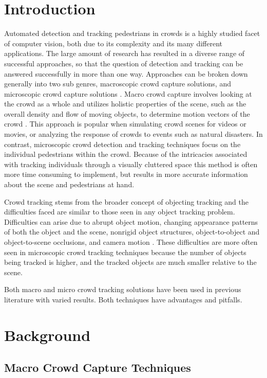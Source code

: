 \documentclass[12pt, onecolumn, conference]{IEEEtran}
\begin{document}
\section{Introduction}

Automated detection and tracking pedestrians in crowds is a highly studied facet of computer vision, both due to its complexity and its many different applications. The large amount of research has resulted in a diverse range of successful approaches, so that the question of detection and tracking can be answered successfully in more than one way. Approaches can be broken down generally into two sub genres, macroscopic crowd capture solutions, and microscopic crowd capture solutions \cite{A. Yilmaz}\cite{M. Thida}. Macro crowd capture involves looking at the crowd as a whole and utilizes holistic properties of the scene, such as the overall density and flow of moving objects, to determine motion vectors of the crowd \cite{M. Thida}. This approach is popular when simulating crowd scenes for videos or movies, or analyzing the response of crowds to events such as natural disasters. In contrast, microscopic crowd detection and tracking techniques focus on the individual pedestrians within the crowd. Because of the intricacies associated with tracking individuals through a visually cluttered space this method is often more time consuming to implement, but results in more accurate information about the scene and pedestrians at hand. 

Crowd tracking stems from the broader concept of objecting tracking and the difficulties faced are similar to those seen in any object tracking problem. Difficulties can arise due to abrupt object motion, changing appearance patterns of both the object and the scene, nonrigid object structures, object-to-object and object-to-scene occlusions, and camera motion \cite{A. Yilmaz}. These difficulties are more often seen in microscopic crowd tracking techniques because the number of objects being tracked is higher, and the tracked objects are much smaller relative to the scene. 

Both macro and micro crowd tracking solutions have been used in previous literature with varied results. Both techniques have advantages and pitfalls. 

\section{Background}

\subsection{Macro Crowd Capture Techniques}
\end{document}
